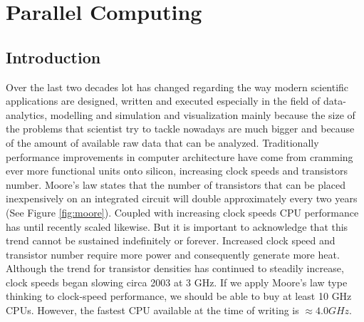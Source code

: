 
\chapter{Parallel Computing}
\label{ch:parallel_computing}

\section{Introduction}
Over the last two decades lot has changed regarding the way modern scientific applications are designed, written and executed especially in the field of data-analytics, modelling and simulation and visualization mainly because the size of the problems that scientist try to tackle nowadays are much bigger and because of the amount of available raw data that can be analyzed. 
Traditionally performance improvements in computer architecture have come from cramming ever more functional units onto silicon, increasing clock speeds and transistors number. Moore's law states that the number of transistors that can be placed inexpensively on an integrated circuit will double approximately every two years (See Figure \ref{fig:moore}). Coupled with increasing clock speeds CPU performance has until recently scaled likewise. But it is important to acknowledge that this trend cannot be sustained indefinitely or forever. Increased clock speed and transistor number require more power and consequently generate more heat. Although the trend for transistor densities has continued to steadily increase, clock speeds began slowing circa 2003 at 3 GHz. If we apply Moore’s law type thinking to clock-speed performance, we should be able to buy at least 10 GHz CPUs. However, the fastest CPU available at the time of writing is $\approx 4.0 GHz$.

